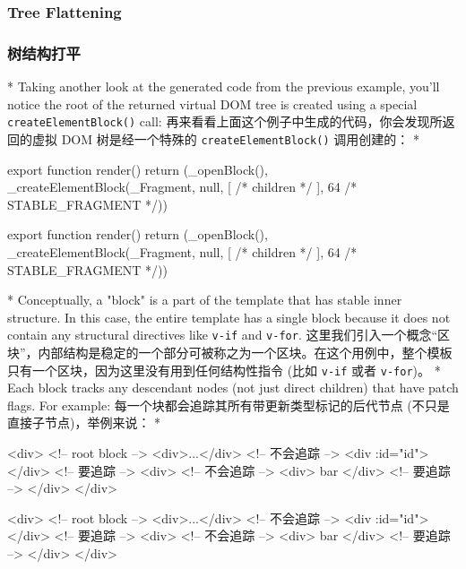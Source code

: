 \begin{paracol}{2}
\subsubsection{Tree Flattening}
\switchcolumn
\subsubsection{树结构打平}
\switchcolumn[0]*%
Taking another look at the generated code from the previous example,
you'll notice the root of the returned virtual DOM tree is created using
a special \texttt{createElementBlock()} call:
\switchcolumn
再来看看上面这个例子中生成的代码，你会发现所返回的虚拟 DOM
树是经一个特殊的 \texttt{createElementBlock()} 调用创建的：
\switchcolumn[0]*%
\begin{codeJs}
export function render() {
  return (_openBlock(), _createElementBlock(_Fragment, null, [
    /* children */
  ], 64 /* STABLE_FRAGMENT */))
}
\end{codeJs}
\switchcolumn
\begin{codeJs}
export function render() {
  return (_openBlock(), _createElementBlock(_Fragment, null, [
    /* children */
  ], 64 /* STABLE_FRAGMENT */))
}
\end{codeJs}
\switchcolumn[0]*%
Conceptually, a "block" is a part of the template that has stable inner
structure. In this case, the entire template has a single block because
it does not contain any structural directives like \texttt{v-if} and
\texttt{v-for}.
\switchcolumn
这里我们引入一个概念``区块''，内部结构是稳定的一个部分可被称之为一个区块。在这个用例中，整个模板只有一个区块，因为这里没有用到任何结构性指令
(比如 \texttt{v-if} 或者 \texttt{v-for})。
\switchcolumn[0]*%
Each block tracks any descendant nodes (not just direct children) that
have patch flags. For example:
\switchcolumn
每一个块都会追踪其所有带更新类型标记的后代节点
(不只是直接子节点)，举例来说：
\switchcolumn[0]*%
\begin{codeHtml}
<div> <!-- root block -->
  <div>...</div>         <!-- 不会追踪 -->
  <div :id="id"></div>   <!-- 要追踪 -->
  <div>                  <!-- 不会追踪 -->
    <div>{{ bar }}</div> <!-- 要追踪 -->
  </div>
</div>
\end{codeHtml}
\switchcolumn
\begin{codeHtml}
<div> <!-- root block -->
  <div>...</div>         <!-- 不会追踪 -->
  <div :id="id"></div>   <!-- 要追踪 -->
  <div>                  <!-- 不会追踪 -->
    <div>{{ bar }}</div> <!-- 要追踪 -->
  </div>
</div>
\end{codeHtml}

\end{paracol}
